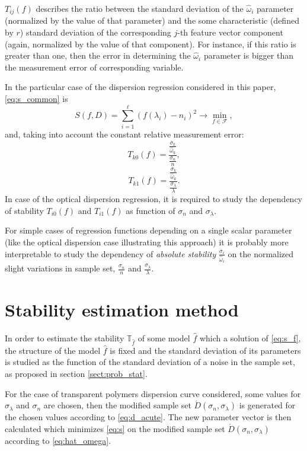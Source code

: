 \documentclass[11pt,a4paper]{article}
\theoremstyle{definition}
\begin{document}
$T_{ij}(f)$ describes the ratio between the standard deviation of the $\hat{\omega}_i$ parameter
(normalized by the value of that parameter) and the some characteristic (defined by $r$)
standard deviation of the corresponding $j$-th feature vector component (again, normalized by
the value of that component).
For instance, if this ratio is greater than one, then the error in determining the $\hat{\omega}_i$
parameter is bigger than the measurement error of corresponding variable.

In the particular case of the dispersion regression considered in this paper, \eqref{eq:s_common}
is
\begin{equation}
  S(f, D) = \sum_{i = 1}^\ell (f(\lambda_i) - n_i)^2 \rightarrow \min_{f \in \mathcal{F}},
  \label{eq:s}
\end{equation}
and, taking into account the constant relative measurement error:
\[
  T_{k0}(f) = \frac{\frac{\overline{\sigma}_k}{\hat{\omega}_k}}{\frac{\sigma_n}{n}},
\]
\[
  T_{k1}(f) = \frac{\frac{\overline{\sigma}_k}{\hat{\omega}_k}}{\frac{\sigma_{\lambda}}{\lambda}}.
\]
In case of the optical dispersion regression, it is required to study the dependency of stability
$T_{i0}(f)$ and $T_{i1}(f)$ as function of $\sigma_n$ and $\sigma_{\lambda}$.

For simple cases of regression functions depending on a single scalar parameter (like the optical
dispersion case illustrating this approach) it is probably more interpretable to study the
dependency of \emph{absolute stability} $\frac{\overline{\sigma}_i}{\hat{\omega}_i}$ on the
normalized slight variations in sample set, $\frac{\sigma_n}{n}$ and $\frac{\sigma_{\lambda}}{\lambda}$.

\section{Stability estimation method}

In order to estimate the stability $\mathbb{T}_{\hat{f}}$ of some model $\hat{f}$
which a solution of \eqref{eq:s_f}, the structure of the model $\hat{f}$ is fixed
and the standard deviation of its parameters is studied as the function of the
standard deviation of a noise in the sample set, as proposed in section
\ref{sect:prob_stat}.

For the case of transparent polymers dispersion curve considered,
some values for $\sigma_{\lambda}$ and $\sigma_n$ are chosen,
then the modified sample set $\acute{D}(\sigma_n, \sigma_{\lambda})$ is
generated for the chosen values according to \eqref{eq:d_acute}. The new
parameter vector is then calculated which minimizes \eqref{eq:s} on the
modified sample set $\acute{D}(\sigma_n, \sigma_{\lambda})$ according to
\eqref{eq:hat_omega}.
\end{document}
